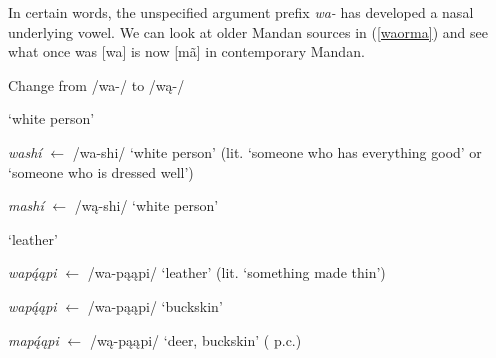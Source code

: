 \label{allomorphgrammaticalized}

In certain words, the unspecified argument prefix \textit{wa-} has developed a nasal underlying vowel. We can look at older Mandan sources in (\ref{waorma}) and see what once was [wa] is now [mã] in contemporary Mandan.

\begin{exe}

\item\label{waorma} Change from /wa-/ to /wą-/

	\begin{xlist}
	
	\item `white person'
	
		\begin{xlist}
		
		\item \textit{washí} $\leftarrow$ /wa-shi/ `white person' (lit. `someone who has everything good' or `someone who is dressed well') \citep[246]{maximilian1839}
		
		\item \textit{mashí} $\leftarrow$ /wą-shi/ `white person' \citep[276]{hollow1970} 
		
		\end{xlist}
		
	\item `leather'
	
		\begin{xlist}
		
		\item \textit{wapą́ąpi} $\leftarrow$ /wa-pąąpi/ `leather' (lit. `something made thin') \citep[249]{maximilian1839}
		
		\item \textit{wapą́ąpi} $\leftarrow$ /wa-pąąpi/ `buckskin' \citep[136]{hollow1970}
		
		\item \textit{mapą́ąpi} $\leftarrow$ /wą-pąąpi/ `deer, buckskin' (\citeauthor{benson2000} p.c.)
		
		\end{xlist}
	
	\end{xlist}

\end{exe}

